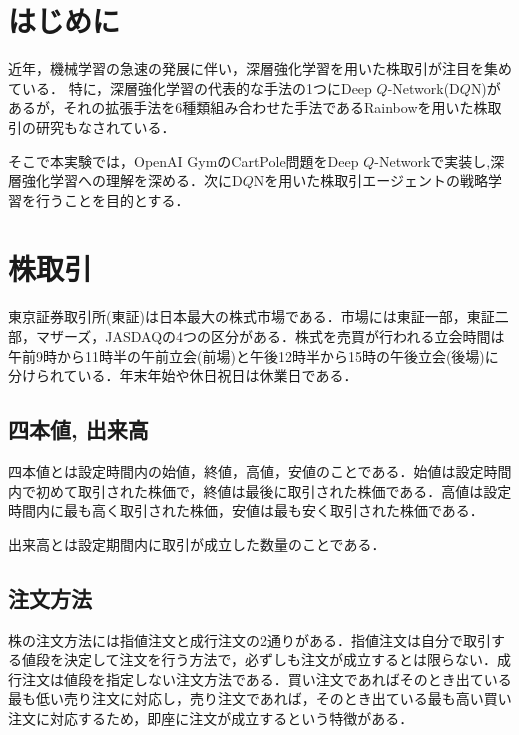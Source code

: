 \documentclass[twocolumn]{jarticle}
\begin{document}

\section{はじめに}
近年，機械学習の急速の発展に伴い，深層強化学習を用いた株取引が注目を集めている．
特に，深層強化学習の代表的な手法の1つにDeep $Q$-Network(D$Q$N)があるが，それの拡張手法を6種類組み合わせた手法であるRainbowを用いた株取引の研究\cite{d_mori}もなされている．

そこで本実験では，OpenAI GymのCartPole問題をDeep $Q$-Networkで実装し,深層強化学習への理解を深める．次にD$Q$Nを用いた株取引エージェントの戦略学習を行うことを目的とする．

\section{株取引}
    東京証券取引所(東証)は日本最大の株式市場である．市場には東証一部，東証二部，マザーズ，JASDAQの4つの区分がある．株式を売買が行われる立会時間は午前9時から11時半の午前立会(前場)と午後12時半から15時の午後立会(後場)に分けられている．年末年始や休日祝日は休業日である．

    \subsection{四本値, 出来高}
    四本値とは設定時間内の始値，終値，高値，安値のことである．始値は設定時間内で初めて取引された株価で，終値は最後に取引された株価である．高値は設定時間内に最も高く取引された株価，安値は最も安く取引された株価である．
    
    出来高とは設定期間内に取引が成立した数量のことである．

    \subsection{注文方法}
    株の注文方法には指値注文と成行注文の2通りがある．指値注文は自分で取引する値段を決定して注文を行う方法で，必ずしも注文が成立するとは限らない．成行注文は値段を指定しない注文方法である．買い注文であればそのとき出ている最も低い売り注文に対応し，売り注文であれば，そのとき出ている最も高い買い注文に対応するため，即座に注文が成立するという特徴がある．
    
\end{document}
